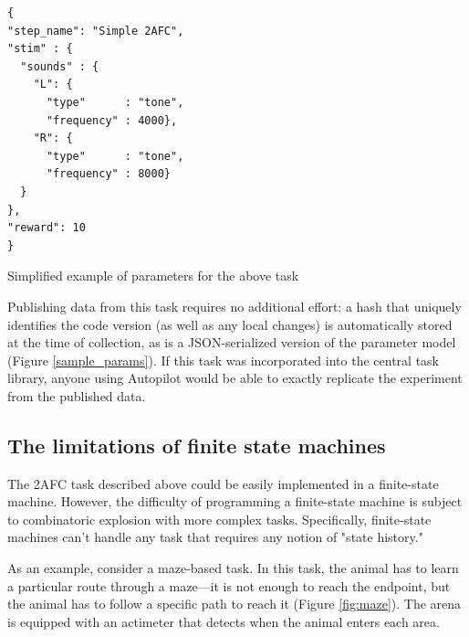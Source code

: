 \begin{marginfigure}[1cm]
\begin{verbatim}
{
"step_name": "Simple 2AFC",
"stim" : {
  "sounds" : {
    "L": {
      "type"      : "tone",
      "frequency" : 4000},
    "R": {
      "type"      : "tone",
      "frequency" : 8000}
  }
},
"reward": 10
}
\end{verbatim}
\caption{Simplified example of parameters for the above task}
\label{sample_params}
\end{marginfigure}

Publishing data from this task requires no additional effort: a hash that uniquely identifies the code version (as well as any local changes) is automatically stored at the time of collection, as is a JSON-serialized version of the parameter model (Figure \ref{sample_params}). If this task was incorporated into the central task library, anyone using Autopilot would be able to exactly replicate the experiment from the published data.


\subsection{The limitations of finite state machines}
\label{sec:fsmlimits}

The 2AFC task described above could be easily implemented in a finite-state machine. However, the difficulty of programming a finite-state machine is subject to combinatoric explosion with more complex tasks. Specifically, finite-state machines can't handle any task that requires any notion of "state history." 

As an example, consider a maze-based task. In this task, the animal has to learn a particular route through a maze---it is not enough to reach the endpoint, but the animal has to follow a specific path to reach it (Figure \ref{fig:maze}). The arena is equipped with an actimeter that detects when the animal enters each area.

